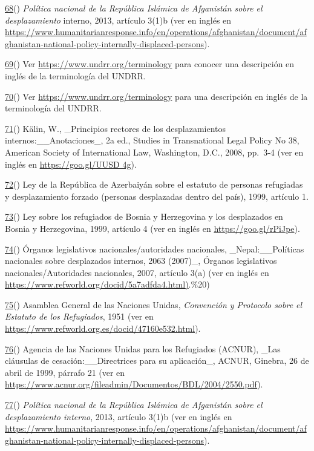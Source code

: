 \documentclass[
]{book}
\begin{document}
\protect\hyperlink{sdfootnote68anc}{68}() \emph{Política nacional de la República Islámica de Afganistán sobre el desplazamiento} interno, 2013, artículo 3(1)b (ver en inglés en \url{https://www.humanitarianresponse.info/en/operations/afghanistan/document/afghanistan-national-policy-internally-displaced-persons}).

\protect\hyperlink{sdfootnote69anc}{69}() Ver \url{https://www.undrr.org/terminology} para conocer una descripción en inglés de la terminología del UNDRR.

\protect\hyperlink{sdfootnote70anc}{70}() Ver \url{https://www.undrr.org/terminology} para una descripción en inglés de la terminología del UNDRR.

\protect\hyperlink{sdfootnote71anc}{71}() Kälin, W., \_Principios rectores de los desplazamientos internos:\_\_Anotaciones\_, 2a ed., Studies in Transnational Legal Policy No 38, American Society of International Law, Washington, D.C., 2008, pp.~3-4 (ver en inglés en \href{https://goo.gl/UUSD4g}{https://goo.gl/UUSD 4g}).

\protect\hyperlink{sdfootnote72anc}{72}() Ley de la República de Azerbaiyán sobre el estatuto de personas refugiadas y desplazamiento forzado (personas desplazadas dentro del país), 1999, artículo 1.

\protect\hyperlink{sdfootnote73anc}{73}() Ley sobre los refugiados de Bosnia y Herzegovina y los desplazados en Bosnia y Herzegovina, 1999, artículo 4 (ver en inglés en \url{https://goo.gl/rPiJpe}).

\protect\hyperlink{sdfootnote74anc}{74}() Órganos legislativos nacionales/autoridades nacionales, \_Nepal:\_\_Políticas nacionales sobre desplazados internos, 2063 (2007)\_, Órganos legislativos nacionales/Autoridades nacionales, 2007, artículo 3(a) (ver en inglés en \url{https://www.refworld.org/docid/5a7adfda4.html}\href{https://goo.gl/i68FU2}{)}.\%20)

\protect\hyperlink{sdfootnote75anc}{75}() Asamblea General de las Naciones Unidas, \emph{Convención y Protocolo sobre el Estatuto de los Refugiados}, 1951 (ver en \url{https://www.refworld.org.es/docid/47160e532.html}).

\protect\hyperlink{sdfootnote76anc}{76}() Agencia de las Naciones Unidas para los Refugiados (ACNUR), \_Las cláusulas de cesación:\_\_Directrices para su aplicación\_, ACNUR, Ginebra, 26 de abril de 1999, párrafo 21 (ver en \url{https://www.acnur.org/fileadmin/Documentos/BDL/2004/2550.pdf}).

\protect\hyperlink{sdfootnote77anc}{77}() \emph{Política nacional de la República Islámica de Afganistán sobre el desplazamiento interno}, 2013, artículo 3(1)b (ver en inglés en \url{https://www.humanitarianresponse.info/en/operations/afghanistan/document/afghanistan-national-policy-internally-displaced-persons}).
\end{document}
